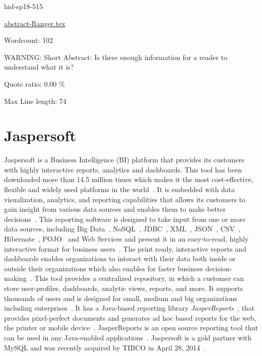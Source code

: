 \begin{IU}

hid-sp18-515

\href{https://github.com/cloudmesh-community/hid-sp18-515/blob/master//technology/abstract-Ranger.tex}{abstract-Ranger.tex}

 

Wordcount: 102

WARNING: Short Abstract: Is there enough information for a reader to understand what it is?


Quote ratio: 0.00 \%
 
Max Line length: 74
\end{IU}

\section{Jaspersoft}

Jaspersoft is a Business Intelligence (BI) platform that provides its
customers with highly interactive reports, analytics and dashboards. This tool
has been downloaded more than 14.5 million times which makes it the most
cost-effective, flexible and widely used platforms in the 
world~\cite{hid-sp18-516-www-finances-online}. It is embedded with data 
visualization, analytics, and reporting capabilities that allows its
customers to gain insight from various data sources and enables them to make
better decisions~\cite{hid-sp18-516-www-finances-online}. This reporting
software is designed to take input from one or more
data sources, including Big Data~\cite{hid-sp18-516-www-wiki-bigdata}, 
NoSQL~\cite{hid-sp18-516-www-wiki-nosql}, JDBC~\cite{hid-sp18-516-www-wiki-jdbc}, 
XML~\cite{hid-sp18-516-www-wiki-xml}, JSON~\cite{hid-sp18-516-www-wiki-json}, 
CSV~\cite{hid-sp18-516-www-wiki-csv}, 
Hibernate~\cite{hid-sp18-516-www-wiki-hibernate}, 
POJO~\cite{hid-sp18-516-www-wiki-pojo} and Web Services and present it in an 
easy-to-read, highly interactive format for business 
users~\cite{hid-sp18-516-www-jaspersoft-overview}. The print ready, interactive 
reports and dashboards enables organizations to interact with their data both 
inside or outside their organizations which also enables for faster business 
decision-making~\cite{hid-sp18-516-www-jaspersoft-overview}. This tool
provides a centralized repository, in which a customer can store user-profiles,
dashboards, analytic views, reports, and more. It supports thousands of users
and is designed for small, medium and big organizations including
enterprises~\cite{hid-sp18-516-www-finances-online}. It has a Java-based
reporting library
\textit{JasperReports}~\cite{hid-sp18-516-www-finances-online}, that provides
pixel-perfect documents and generates ad hoc based reports for the web, the
printer or mobile device~\cite{hid-sp18-516-www-jaspersoft-overview}.
JasperReports is an open source reporting tool that can be
used in any Java-enabled
applications~\cite{hid-sp18-516-www-wiki-jasperreports}. Jaspersoft is a gold
partner with MySQL and was recently acquired by TIBCO in April 28,
2014~\cite{hid-sp18-516-www-wiki-jasperreports}.


